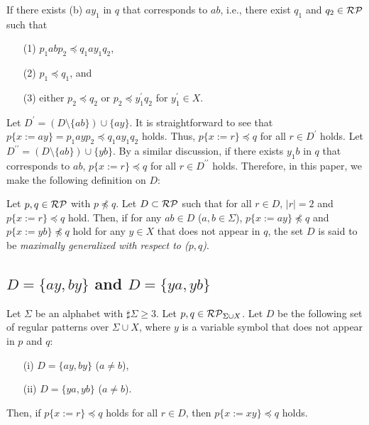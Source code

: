 \noindent
If there exists (b) $ay_{1}$ in $q$ that corresponds to $ab$, i.e., there exist $q_{1}$ and $q_{2}\in \mathcal{RP}$ such that
  \begin{enumerate}
  \item[(1)] $p_{1}abp_{2} \preceq q_{1}ay_{1}q_{2}$, 
  \item[(2)] $p_{1} \preceq q_{1}$, and
  \item[(3)] either $p_{2} \preceq q_{2}$ or $p_{2} \preceq y_{1}^{\prime}q_{2}$ for $y_{1}^{\prime}\in X$.
  \end{enumerate}
Let $D^{\prime} = (D \setminus \{ab\}) \cup \{ay\}$.
It is straightforward to see that $p\{x:=ay\} = p_{1}ayp_{2} \preceq q_{1}ay_{1}q_{2}$ holds.
Thus, $p \{ x := r \} \preceq q$ for all $r \in D^{\prime}$ holds.
Let $D^{\prime\prime} = (D \setminus \{ab\}) \cup \{yb\}$.
By a similar discussion, if there exists $y_{1}b$ in $q$ that corresponds to $ab$, $p \{ x := r \} \preceq q$ for all $r \in D^{\prime\prime}$ holds.
Therefore, in this paper, we make the following definition on $D$:

\smallskip

\begin{dfn}
Let $p,q \in \mathcal{RP}$ {\color{red} with $p\not\preceq q$}.
Let $D \subset \mathcal{RP}$ such that for all $r\in D$, $|r| = 2$ and $p \{ x := r \} \preceq q$ hold.
Then, if for any $ab\in D$ ($a,b\in\Sigma$), $p \{ x := ay \} \not\preceq q$ and $p \{ x := yb \} \not\preceq q$ hold for any $y \in X$ that does not appear in $q$, the set $D$ is said to be \textit{maximally generalized {\color{red}with respect to} ($p,q$)}.
\end{dfn}



\subsection{$D=\{ ay, by \}$ and $D=\{ ya, yb \}$}\label{subsec:d2}

\begin{lem}\label{lem:twovariables}
Let $\Sigma$ be an alphabet with $\sharp\Sigma \ge 3$.
Let $p,q \in \mathcal{RP}_{\Sigma\cup X}$.
Let $D$ be the following set of regular patterns {\color{red}over} $\Sigma\cup X$, where $y$ is a variable symbol that does not appear in $p$ and $q$:
\begin{enumerate}
\item[{\rm (i)}] $D=\{ ay, by \}$ ($a \not= b$),
\item[{\rm (ii)}] $D=\{ ya, yb \}$ ($a \not= b$).
\end{enumerate}
Then, if $p \{ x := r \} \preceq q$ holds for all $r \in D$, then $p \{ x := xy \} \preceq q$ holds.
\end{lem}

